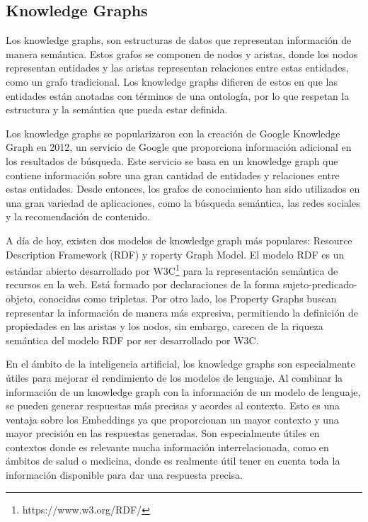 \subsection{Knowledge Graphs}
Los knowledge graphs, son estructuras de datos que representan información de manera semántica. Estos grafos se componen de nodos y aristas, donde los nodos representan entidades y las aristas representan relaciones entre estas entidades, como un grafo tradicional. Los knowledge graphs difieren de estos en que las entidades están anotadas con términos de una ontología, por lo que respetan la estructura y la semántica que pueda estar definida.  

Los knowledge graphs se popularizaron con la creación de Google Knowledge Graph en 2012, un servicio de Google que proporciona información adicional en los resultados de búsqueda. Este servicio se basa en un knowledge graph que contiene información sobre una gran cantidad de entidades y relaciones entre estas entidades. Desde entonces, los grafos de conocimiento han sido utilizados en una gran variedad de aplicaciones, como la búsqueda semántica, las redes sociales y la recomendación de contenido.

A día de hoy, existen dos modelos de knowledge graph más populares: Resource Description Framework (RDF) y roperty Graph Model. El modelo RDF es un estándar abierto desarrollado por W3C\footnote{https://www.w3.org/RDF/} para la representación semántica de recursos en la web. Está formado por declaraciones de la forma sujeto-predicado-objeto, conocidas como tripletas. Por otro lado, los Property Graphs buscan representar la información de manera más expresiva, permitiendo la definición de propiedades en las aristas y los nodos, sin embargo, carecen de la riqueza semántica del modelo RDF por ser desarrollado por W3C. 

En el ámbito de la inteligencia artificial, los knowledge graphs son especialmente útiles para mejorar el rendimiento de los modelos de lenguaje. Al combinar la información de un knowledge graph con la información de un modelo de lenguaje, se pueden generar respuestas más precisas y acordes al contexto. Esto es una ventaja sobre los Embeddings ya que proporcionan un mayor contexto y una mayor precisión en las respuestas generadas. Son especialmente útiles en contextos donde es relevante mucha información interrelacionada, como en ámbitos de salud o medicina, donde es realmente útil tener en cuenta toda la información disponible para dar una respuesta precisa.